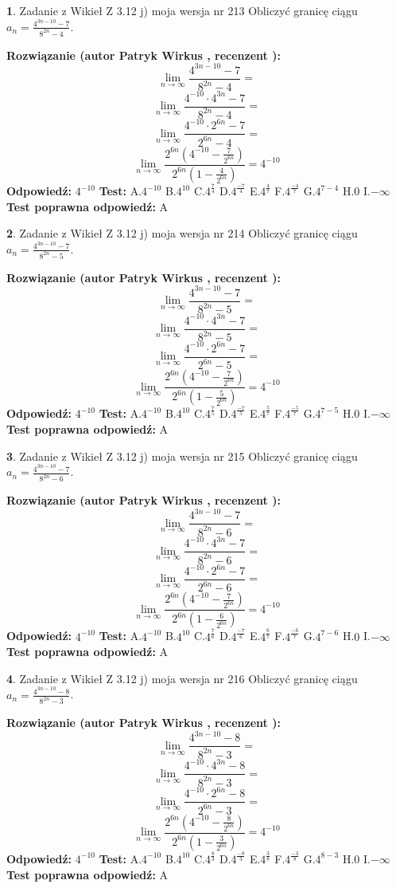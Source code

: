\documentclass[12pt, a4paper]{article}
\theoremstyle{definition} %
\newtheorem{zad}{}
\newcommand{\zadStart}[1]{\begin{zad}#1\newline}
\newcommand{\zadStop}{\end{zad}}
\newcommand{\rozwStart}[2]{\noindent \textbf{Rozwiązanie (autor #1 , recenzent #2): }\newline}
\newcommand{\rozwStop}{\newline}
\newcommand{\odpStart}{\noindent \textbf{Odpowiedź:}\newline}
\newcommand{\odpStop}{\newline}
\newcommand{\testStart}{\noindent \textbf{Test:}\newline}
\newcommand{\testStop}{\newline}
\newcommand{\kluczStart}{\noindent \textbf{Test poprawna odpowiedź:}\newline}
\newcommand{\kluczStop}{\newline}
\begin{document}
\zadStart{Zadanie z Wikieł Z 3.12 j) moja wersja nr 213}
Obliczyć granicę ciągu $a_{n}=\frac{4^{3n-10}-7}{8^{2n}-4}$.
\zadStop
\rozwStart{Patryk Wirkus}{}
$$\lim\limits_{n\to\infty}\frac{4^{3n-10}-7}{8^{2n}-4}=$$
$$\lim\limits_{n\to\infty}\frac{4^{-10} \cdot 4^{3n}-7}{8^{2n}-4}=$$
$$\lim\limits_{n\to\infty}\frac{4^{-10} \cdot 2^{6n}-7}{2^{6n}-4}=$$
$$\lim\limits_{n\to\infty}\frac{2^{6n}(4^{-10} - \frac{7}{2^{6n}})}{2^{6n}(1-\frac{4}{2^{6n}})}= 4^{-10}$$
\rozwStop
\odpStart
$4^{-10}$
\odpStop
\testStart
A.$4^{-10}$
B.$4^{10}$
C.$4^{\frac{7}{4}}$
D.$4^{\frac{-7}{4}}$
E.$4^{\frac{4}{7}}$
F.$4^{\frac{-4}{7}}$
G.$4^{7-4}$
H.$0$
I.$-\infty$
\testStop
\kluczStart
A
\kluczStop



\zadStart{Zadanie z Wikieł Z 3.12 j) moja wersja nr 214}
Obliczyć granicę ciągu $a_{n}=\frac{4^{3n-10}-7}{8^{2n}-5}$.
\zadStop
\rozwStart{Patryk Wirkus}{}
$$\lim\limits_{n\to\infty}\frac{4^{3n-10}-7}{8^{2n}-5}=$$
$$\lim\limits_{n\to\infty}\frac{4^{-10} \cdot 4^{3n}-7}{8^{2n}-5}=$$
$$\lim\limits_{n\to\infty}\frac{4^{-10} \cdot 2^{6n}-7}{2^{6n}-5}=$$
$$\lim\limits_{n\to\infty}\frac{2^{6n}(4^{-10} - \frac{7}{2^{6n}})}{2^{6n}(1-\frac{5}{2^{6n}})}= 4^{-10}$$
\rozwStop
\odpStart
$4^{-10}$
\odpStop
\testStart
A.$4^{-10}$
B.$4^{10}$
C.$4^{\frac{7}{5}}$
D.$4^{\frac{-7}{5}}$
E.$4^{\frac{5}{7}}$
F.$4^{\frac{-5}{7}}$
G.$4^{7-5}$
H.$0$
I.$-\infty$
\testStop
\kluczStart
A
\kluczStop



\zadStart{Zadanie z Wikieł Z 3.12 j) moja wersja nr 215}
Obliczyć granicę ciągu $a_{n}=\frac{4^{3n-10}-7}{8^{2n}-6}$.
\zadStop
\rozwStart{Patryk Wirkus}{}
$$\lim\limits_{n\to\infty}\frac{4^{3n-10}-7}{8^{2n}-6}=$$
$$\lim\limits_{n\to\infty}\frac{4^{-10} \cdot 4^{3n}-7}{8^{2n}-6}=$$
$$\lim\limits_{n\to\infty}\frac{4^{-10} \cdot 2^{6n}-7}{2^{6n}-6}=$$
$$\lim\limits_{n\to\infty}\frac{2^{6n}(4^{-10} - \frac{7}{2^{6n}})}{2^{6n}(1-\frac{6}{2^{6n}})}= 4^{-10}$$
\rozwStop
\odpStart
$4^{-10}$
\odpStop
\testStart
A.$4^{-10}$
B.$4^{10}$
C.$4^{\frac{7}{6}}$
D.$4^{\frac{-7}{6}}$
E.$4^{\frac{6}{7}}$
F.$4^{\frac{-6}{7}}$
G.$4^{7-6}$
H.$0$
I.$-\infty$
\testStop
\kluczStart
A
\kluczStop



\zadStart{Zadanie z Wikieł Z 3.12 j) moja wersja nr 216}
Obliczyć granicę ciągu $a_{n}=\frac{4^{3n-10}-8}{8^{2n}-3}$.
\zadStop
\rozwStart{Patryk Wirkus}{}
$$\lim\limits_{n\to\infty}\frac{4^{3n-10}-8}{8^{2n}-3}=$$
$$\lim\limits_{n\to\infty}\frac{4^{-10} \cdot 4^{3n}-8}{8^{2n}-3}=$$
$$\lim\limits_{n\to\infty}\frac{4^{-10} \cdot 2^{6n}-8}{2^{6n}-3}=$$
$$\lim\limits_{n\to\infty}\frac{2^{6n}(4^{-10} - \frac{8}{2^{6n}})}{2^{6n}(1-\frac{3}{2^{6n}})}= 4^{-10}$$
\rozwStop
\odpStart
$4^{-10}$
\odpStop
\testStart
A.$4^{-10}$
B.$4^{10}$
C.$4^{\frac{8}{3}}$
D.$4^{\frac{-8}{3}}$
E.$4^{\frac{3}{8}}$
F.$4^{\frac{-3}{8}}$
G.$4^{8-3}$
H.$0$
I.$-\infty$
\testStop
\kluczStart
A
\kluczStop
\end{document}
